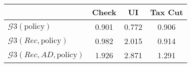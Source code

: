 \begin{tabular}{@{}lccc@{}} 
\toprule 
                          & Check      & UI    & Tax Cut    \\  \midrule 
$\mathcal{G}3(\text{policy})$ & 0.901  & 0.772  & 0.906     \\ 
$\mathcal{G}3(Rec,\text{policy})$ & 0.982  & 2.015  & 0.914     \\ 
$\mathcal{G}3(Rec, AD,\text{policy})$ & 1.926  & 2.871  & 1.291     \\ 
\end{tabular}  
